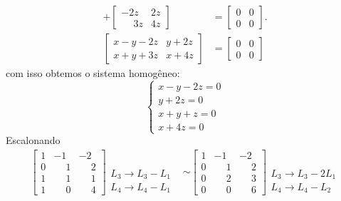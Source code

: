 \begin{exemplos}
\begin{enumerate}
\begin{solucao}
\begin{align*}
					+ \begin{bmatrix}-2z & 2z\\\phantom{-} 3z & 4z\end{bmatrix}
															 &= \begin{bmatrix}0 & 0\\0 & 0\end{bmatrix}.
					\\\begin{bmatrix} x - y - 2z & y + 2z\\x + y + 3z & x + 4z\end{bmatrix} &= \begin{bmatrix}0 & 0\\0 & 0\end{bmatrix}
				\end{align*}
				com isso obtemos o sistema homogêneo:
				\[
					\begin{cases}
						x - y - 2z = 0\\
						y + 2z = 0\\
						x + y + z = 0\\
						x + 4z = 0
					\end{cases}
				\]
				Escalonando
				\begin{align*}
					\begin{bmatrix}
						1 & -1 & -2\\
						0 & \phantom{-} 1 & \phantom{-} 2\\
						1 & \phantom{-} 1 & \phantom{-} 1\\
						1 & \phantom{-} 0 & \phantom{-} 4
					\end{bmatrix}
					\begin{array}{l}
						\phantom{x}\\\phantom{x}\\L_3 \to L_3 - L_1\\L_4 \to L_4 - L_1
					\end{array}&\sim
					\begin{bmatrix}
						1 & -1 & -2\\
						0 & \phantom{-} 1 & \phantom{-} 2\\
						0 & \phantom{-} 2 & \phantom{-} 3\\
						0 & \phantom{-} 0 & \phantom{-} 6
					\end{bmatrix}
					\begin{array}{l}
						\phantom{x}\\\phantom{x}\\L_3 \to L_3 - 2L_1\\L_4 \to L_4 - L_2

\end{array}
\end{align*}
\end{solucao}
\end{enumerate}
\end{exemplos}
